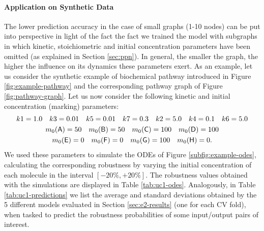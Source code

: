 \paragraph{Application on Synthetic Data}
The lower prediction accuracy in the case of small graphs (1-10 nodes) can be put into perspective in light of the fact the fact we trained the model with subgraphs in which kinetic, stoichiometric and initial concentration parameters have been omitted (as explained in Section \ref{sec:ppn}). In general, the smaller the graph, the higher the influence on its dynamics these parameters exert. As an example, let us consider the synthetic example of biochemical pathway introduced in Figure \ref{fig:example-pathway} and the corresponding pathway graph of Figure \ref{fig:pathway-graph}. Let us now consider the following kinetic and initial concentration (marking) parameters:
\begin{gather*}
  k1 = 1.0 \quad
  k3 = 0.01 \quad
  k5 = 0.01 \quad
  k7 = 0.3  \quad
  k2 = 5.0  \quad
  k4 = 0.1  \quad
  k6 = 5.0 \\
  m_0(\mathsf{A}) = 50\quad
  m_0(\mathsf{B}) = 50\quad
  m_0(\mathsf{C}) = 100\quad
  m_0(\mathsf{D}) = 100\\
  m_0(\mathsf{E}) = 0\quad
  m_0(\mathsf{F}) = 0\quad
  m_0(\mathsf{G}) = 100\quad
  m_0(\mathsf{H}) = 0.
\end{gather*}
We used these parameters to simulate the ODEs of Figure \ref{subfig:example-odes}, calculating the corresponding robustness by varying the initial concentration of each molecule in the interval $[-20\%,+20\%]$. The robustness values obtained with the simulations are displayed in Table \ref{tab:uc1-odes}. Analogously, in Table \ref{tab:uc1-predictions} we list the average and standard deviations obtained by the 5 different models evaluated in Section \ref{sec:e2-results} (one for each CV fold), when tasked to predict the robustness probabilities of some input/output pairs of interest.

